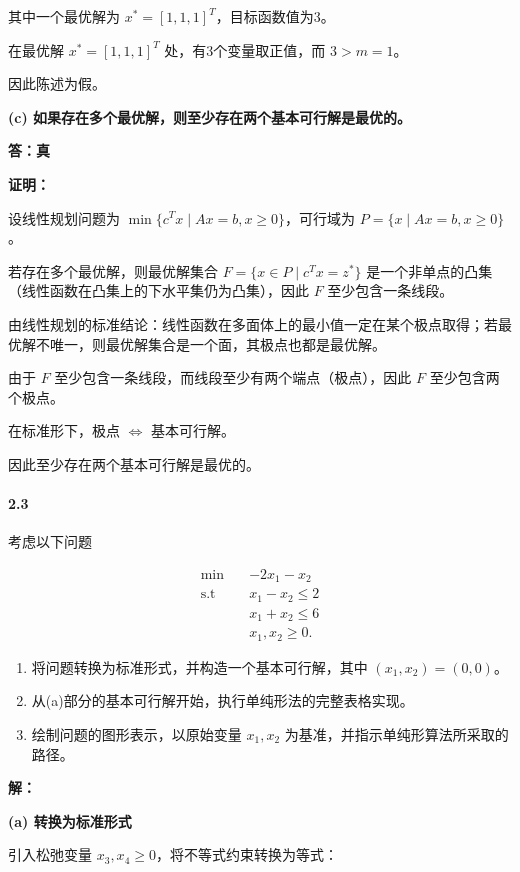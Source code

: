\documentclass[12pt,a4paper]{article}
\begin{document}
其中一个最优解为 $x^* = [1, 1, 1]^T$，目标函数值为3。

在最优解 $x^* = [1, 1, 1]^T$ 处，有3个变量取正值，而 $3 > m = 1$。

因此陈述为假。

\textbf{(c) 如果存在多个最优解，则至少存在两个基本可行解是最优的。}

\textbf{答：真}

\textbf{证明：}

设线性规划问题为 $\min\{c^T x \mid Ax = b, x \geq 0\}$，可行域为 $P = \{x \mid Ax = b, x \geq 0\}$。

若存在多个最优解，则最优解集合 $F = \{x \in P \mid c^T x = z^*\}$ 是一个非单点的凸集（线性函数在凸集上的下水平集仍为凸集），因此 $F$ 至少包含一条线段。

由线性规划的标准结论：线性函数在多面体上的最小值一定在某个极点取得；若最优解不唯一，则最优解集合是一个面，其极点也都是最优解。

由于 $F$ 至少包含一条线段，而线段至少有两个端点（极点），因此 $F$ 至少包含两个极点。

在标准形下，极点 $\Leftrightarrow$ 基本可行解。

因此至少存在两个基本可行解是最优的。



\paragraph{2.3}
考虑以下问题

\begin{align*}
 \min \quad & -2x_1 - x_2 \\
\text{s.t} \quad & x_1 - x_2 \leq 2 \\
& x_1 + x_2 \leq 6 \\
& x_1, x_2 \geq 0.
\end{align*}


\begin{enumerate}
    \item[a)] 将问题转换为标准形式，并构造一个基本可行解，其中 \((x_1, x_2) = (0, 0)\)。
    \item[b)] 从(a)部分的基本可行解开始，执行单纯形法的完整表格实现。
    \item[c)] 绘制问题的图形表示，以原始变量 \(x_1, x_2\) 为基准，并指示单纯形算法所采取的路径。
\end{enumerate}

\textbf{解：}

\textbf{(a) 转换为标准形式}

引入松弛变量 $x_3, x_4 \geq 0$，将不等式约束转换为等式：
\end{document}
